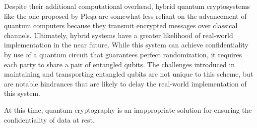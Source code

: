 \documentclass[sigconf]{acmart}
\begin{document}
Despite their additional computational overhead, hybrid quantum cryptosystems like the one proposed by Pleşa are somewhat less reliant on the advancement of quantum computers because they transmit encrypted messages over classical channels. Ultimately, hybrid systems have a greater likelihood of real-world implementation in the near future. While this system can achieve confidentiality by use of a quantum circuit that guarantees perfect randomization\cite{plesa_hybrid_2017}, it requires each party to share a pair of entangled qubits. The challenges introduced in maintaining and transporting entangled qubits are not unique to this scheme, but are notable hindrances that are likely to delay the real-world implementation of this system.

At this time, quantum cryptography is an inappropriate solution for ensuring the confidentiality of data at rest. %


\end{document}
